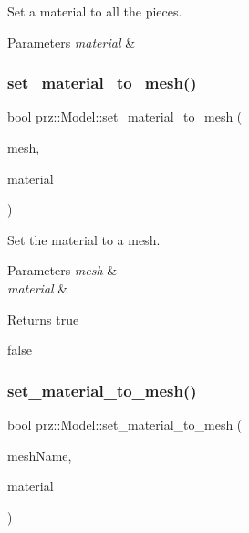 Set a material to all the pieces. 


\begin{DoxyParams}{Parameters}
{\em material} & \\
\hline
\end{DoxyParams}
\mbox{\label{classprz_1_1_model_ac68a6c012bdcaf9a24c275f7acf081bf}} 
\subsubsection{\texorpdfstring{set\_material\_to\_mesh()}{set\_material\_to\_mesh()}\hspace{0.1cm}{\footnotesize\ttfamily [1/2]}}
{\footnotesize\ttfamily bool prz\+::\+Model\+::set\+\_\+material\+\_\+to\+\_\+mesh (\begin{DoxyParamCaption}\item[{P\+S\+Ptr$<$ \mbox{\hyperlink{classprz_1_1_mesh}{Mesh}} $>$}]{mesh,  }\item[{P\+S\+Ptr$<$ \mbox{\hyperlink{classprz_1_1_material}{Material}} $>$}]{material }\end{DoxyParamCaption})\hspace{0.3cm}{\ttfamily [inline]}}



Set the material to a mesh. 


\begin{DoxyParams}{Parameters}
{\em mesh} & \\
\hline
{\em material} & \\
\hline
\end{DoxyParams}
\begin{DoxyReturn}{Returns}
true 

false 
\end{DoxyReturn}
\mbox{\label{classprz_1_1_model_a8ce72cf9e0f9df5dcf760e1ff748e8cc}} 
\subsubsection{\texorpdfstring{set\_material\_to\_mesh()}{set\_material\_to\_mesh()}\hspace{0.1cm}{\footnotesize\ttfamily [2/2]}}
{\footnotesize\ttfamily bool prz\+::\+Model\+::set\+\_\+material\+\_\+to\+\_\+mesh (\begin{DoxyParamCaption}\item[{const P\+String \&}]{mesh\+Name,  }\item[{P\+S\+Ptr$<$ \mbox{\hyperlink{classprz_1_1_material}{Material}} $>$}]{material }\end{DoxyParamCaption})\hspace{0.3cm}{\ttfamily [inline]}}



